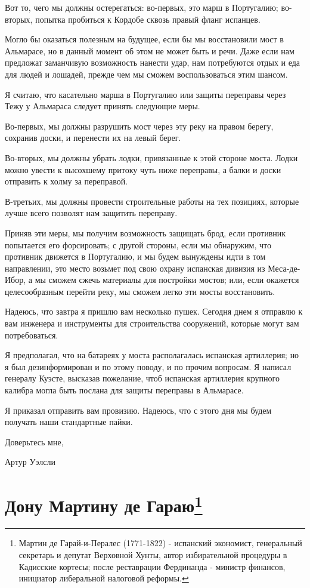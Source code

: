 \documentclass[
  oneside,
  12pt,
  titlepage]{book}
\begin{document}
Вот то, чего мы должны остерегаться: во-первых, это марш в Португалию; во-вторых, попытка пробиться к Кордобе сквозь правый фланг испанцев.

Могло бы оказаться полезным на будущее, если бы мы восстановили мост в Альмарасе, но в данный момент об этом не может быть и речи. Даже если нам предложат заманчивую возможность нанести удар, нам потребуются отдых и еда для людей и лошадей, прежде чем мы сможем воспользоваться этим шансом.

Я считаю, что касательно марша в Португалию или защиты переправы через Тежу у Альмараса следует принять следующие меры.

Во-первых, мы должны разрушить мост через эту реку на правом берегу, сохранив доски, и перенести их на левый берег.

Во-вторых, мы должны убрать лодки, привязанные к этой стороне моста. Лодки можно увести к высохшему притоку чуть ниже переправы, а балки и доски отправить к холму за переправой.

В-третьих, мы должны провести строительные работы на тех позициях, которые лучше всего позволят нам защитить переправу.

Приняв эти меры, мы получим возможность защищать брод, если противник попытается его форсировать; с другой стороны, если мы обнаружим, что противник движется в Португалию, и мы будем вынуждены идти в том направлении, это место возьмет под свою охрану испанская дивизия из Меса-де-Ибор, а мы сможем сжечь материалы для постройки мостов; или, если окажется целесообразным перейти реку, мы сможем легко эти мосты восстановить.

Надеюсь, что завтра я пришлю вам несколько пушек. Сегодня днем я отправлю к вам инженера и инструменты для строительства сооружений, которые могут вам потребоваться.

Я предполагал, что на батареях у моста располагалась испанская артиллерия; но я был дезинформирован и по этому поводу, и по прочим вопросам. Я написал генералу Куэсте, высказав пожелание, чтоб испанская артиллерия крупного калибра могла быть послана для защиты переправы в Альмарасе.

Я приказал отправить вам провизию. Надеюсь, что с этого дня мы будем получать наши стандартные пайки.

Доверьтесь мне,

Артур Уэлсли

\hypertarget{ux434ux43eux43dux443-ux43cux430ux440ux442ux438ux43dux443-ux434ux435-ux433ux430ux440ux430ux44e}{%
\chapter[Дону Мартину де Гараю]{\texorpdfstring{Дону Мартину де Гараю\footnote{Мартин де Гарай-и-Пералес (1771-1822) - испанский экономист, генеральный секретарь и депутат Верховной Хунты, автор избирательной процедуры в Кадисские кортесы; после реставрации Фердинанда - министр финансов, инициатор либеральной налоговой реформы.}}{Дону Мартину де Гараю}}\label{ux434ux43eux43dux443-ux43cux430ux440ux442ux438ux43dux443-ux434ux435-ux433ux430ux440ux430ux44e}}
\end{document}
